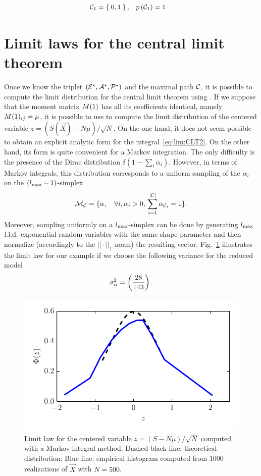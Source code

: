\documentclass{article}
\begin{document}
\begin{equation} \begin{aligned}
 \pC_{1} =\Set{0,1}, \quad &p\p{\pC_{1}} =1 %
\end{aligned} \end{equation} 
\section{Limit laws for the central limit theorem}

Once we know the triplet $(\mathcal{E}^{\star},\mathcal{A}^{\star},\mathcal{P}^{\star})$ and the maximal path $\mathcal C $, it is possible to compute the limit distribution
for the central limit theorem using . 
If we suppose that the moment matrix $M(1)$ has all its coefficients identical, namely $M(1)_{ij}= \mu$, it is possible to use 
to compute the limit distribution of the centered variable $z = (S(\vec X) - N\mu )/ \sqrt{N}$.
On the one hand, it does not seem possible to obtain an explicit analytic form for the integral~\eqref{eq:lim:CLT2}.
On the other hand, its form is quite convenient for a Markov integration.
The only difficulty is the presence of the Dirac distribution $\delta(1 - \sum_i \alpha_i )$.
However, in terms of Markov integrals, this distribution corresponds to a uniform sampling of the $\alpha_i$ on the $({l_{\max}}-1)$-simplex
\begin{equation}
\mathcal M_\mathcal C = \{ \alpha,\quad \forall i ,  \alpha_i >0,\, \sum_{i=1}^{|\mathcal C | } \alpha_{\mathcal C _i}=1 \}. 
\end{equation}
Moreover, sampling uniformly on a ${l_{\max}}$-simplex can be done by generating ${l_{\max}}$
$\mathrm{i.i.d.}$ exponential random variables with the same shape parameter and then normalize (accordingly to the $||\cdot ||_1$ norm) the
resulting vector. Fig.~\ref{fig:clt} illustrates the limit law for our example if we choose
the following variance for the reduced model 
\begin{equation}
\sigma^{2}_{ii} = \left(\frac{28}{143}\right).
\end{equation}
%
\begin{figure}
\centerline{ \includegraphics[width=0.7\columnwidth]{Figs/CLT} }
\caption{ \label{fig:clt} Limit law for the centered variable $z=(S-N\mu)/\sqrt{N}$ computed with a Markov integral method. Dashed black line: theoretical distribution; Blue line:
empirical histogram computed from $1000$ realizations of $\vec X$ with $N=500$.}
\end{figure}
\end{document}
